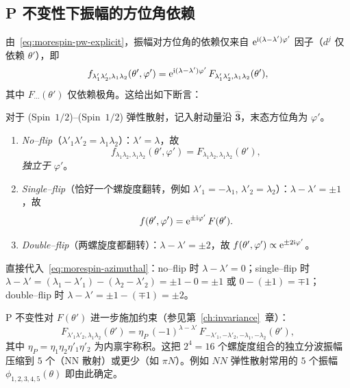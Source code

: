 \subsection{P 不变性下振幅的方位角依赖}
\label{subsec:morespin-Pphi}

由~\eqref{eq:morespin-pw-explicit}，振幅对方位角的依赖仅来自 $\mathrm{e}^{\mathrm{i}(\lambda-\lambda')\varphi'}$ 因子（$d^j$ 仅依赖 $\theta'$），即
\begin{equation}
f_{\lambda'_1\lambda'_2,\lambda_1\lambda_2}(\theta',\varphi')=\mathrm{e}^{\mathrm{i}(\lambda-\lambda')\varphi'}\,F_{\lambda'_1\lambda'_2,\lambda_1\lambda_2}(\theta'),
\label{eq:morespin-azimuthal}
\end{equation}
其中 $F_{\cdots}(\theta')$ 仅依赖极角。这给出如下断言：

\begin{proposition}
\label{prop:morespin-flipphi}
对于 (Spin~$1/2$)–(Spin~$1/2$) 弹性散射，记入射动量沿 $\hat{\bm 3}$，末态方位角为 $\varphi'$。
\begin{enumerate}
\item \emph{No--flip}（$\lambda'_1\lambda'_2=\lambda_1\lambda_2$）：$\lambda'=\lambda$，故
$$
f_{\lambda_1\lambda_2,\lambda_1\lambda_2}(\theta',\varphi')=F_{\lambda_1\lambda_2,\lambda_1\lambda_2}(\theta'),
$$
\emph{独立于 $\varphi'$}。
\item \emph{Single--flip}（恰好一个螺旋度翻转，例如 $\lambda'_1=-\lambda_1$, $\lambda'_2=\lambda_2$）：$\lambda-\lambda'=\pm 1$，故
$$
f(\theta',\varphi')=\mathrm{e}^{\pm\mathrm{i}\varphi'}\,F(\theta').
$$
\item \emph{Double--flip}（两螺旋度都翻转）：$\lambda-\lambda'=\pm 2$，故 $f(\theta',\varphi')\propto\mathrm{e}^{\pm 2\mathrm{i}\varphi'}$。
\end{enumerate}
\end{proposition}

\begin{proof*}
直接代入~\eqref{eq:morespin-azimuthal}：no--flip 时 $\lambda-\lambda'=0$；single--flip 时 $\lambda-\lambda'=(\lambda_1-\lambda'_1)-(\lambda_2-\lambda'_2)=\pm 1-0=\pm 1$ 或 $0-(\pm 1)=\mp 1$；double--flip 时 $\lambda-\lambda'=\pm 1-(\mp 1)=\pm 2$。
\end{proof*}

\begin{remark}
P 不变性对 $F(\theta')$ 进一步施加约束（参见第~\ref{ch:invariance}~章）：
$$
F_{\lambda'_1\lambda'_2,\lambda_1\lambda_2}(\theta')=\eta_P\,(-1)^{\lambda-\lambda'}\,F_{-\lambda'_1,-\lambda'_2,-\lambda_1,-\lambda_2}(\theta'),
$$
其中 $\eta_P=\eta_1\eta_2\eta'_1\eta'_2$ 为内禀宇称积。这把 $2^4=16$ 个螺旋度组合的独立分波振幅压缩到 $5$ 个（NN 散射）或更少（如 $\pi N$）。例如 $NN$ 弹性散射常用的 $5$ 个振幅 $\phi_{1,2,3,4,5}(\theta)$ 即由此确定。
\end{remark}

